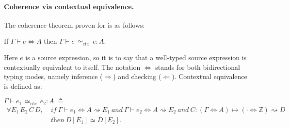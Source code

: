 \paragraph{Coherence via contextual equivalence.}
The coherence theorem proven for \necolus is as follows:

\begin{theorem}\label{thm:coherence}
If $\Gamma \vdash e \Leftrightarrow A$
then $\Gamma \vdash e \, {\simeq}_\mathit{ctx} \, e : A$.
\end{theorem}

\noindent
Here $e$ is a source expression, so it is to say that a well-typed source
expression is contextually equivalent to itself. The notation $\Leftrightarrow$
stands for both bidirectional typing modes, namely inference ($\Rightarrow$) and
checking ($\Leftarrow$). Contextual equivalence is defined as:

\begin{definition}
$\Gamma \vdash e_1 \, {\simeq}_\mathit{ctx} \, e_2 :  A \;\triangleq$
\begin{align*}
\forall E_1\,E_2\,C\,D,\;
  & \textit{if}\ \Gamma \vdash e_1 \Leftrightarrow A \rightsquigarrow E_1 \ \textit{and}\ \Gamma \vdash e_2 \Leftrightarrow A \rightsquigarrow E_2
  \ \textit{and}\ C : (\Gamma \Leftrightarrow A) \mapsto (\cdot \Leftrightarrow  \mathbb{Z} ) \rightsquigarrow D \\
  & \textit{then}\ D[E_1] \simeq D[E_2].
\end{align*}
\end{definition}

